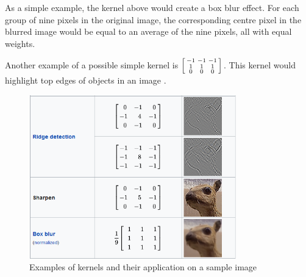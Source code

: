 ﻿\documentclass[12pt,a4paper,notitlepage]{article}
\begin{document}
As a simple example, the kernel above would create a box blur effect. For each group of nine pixels in the original image, the corresponding centre pixel in the blurred image would be equal to an average of the nine pixels, all with equal weights.

Another example of a possible simple kernel is \(\begin{bsmallmatrix}-1 & -1 & -1 \\ 1 & 1 & 1 \\ 0 & 0 & 0\end{bsmallmatrix}\). This kernel would highlight top edges of objects in an image \cite{deep_lizard_convolutional_2017}.
\begin{figure}[htbp]
 \centering
  \includegraphics[width=0.8\textwidth]{images/image-convolutions-examples.png}
 \caption{Examples of kernels and their application on a sample image \cite{wikipedia_collaborators_kernel_2022}}
 \label{fig:image-convolutions-examples}
\end{figure}
\end{document}

